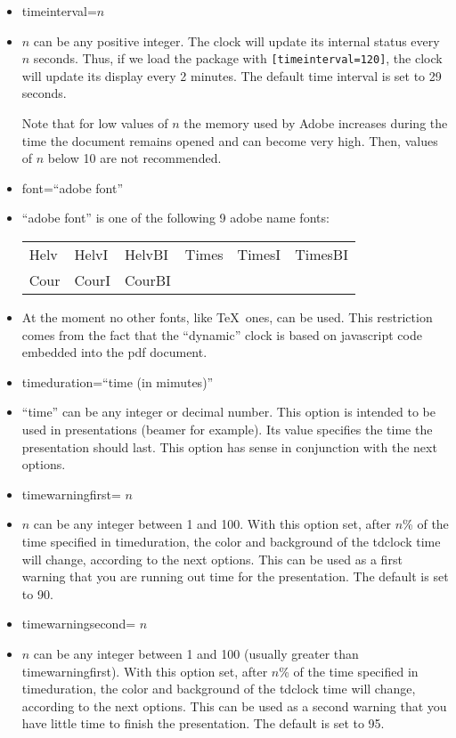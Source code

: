 \documentclass{article}
\begin{document}
\begin{itemize}
\item  timeinterval=$n$
\item[]
$n$ can be any positive integer. The clock will update its internal status every $n$ seconds.  Thus, if we load
the package with \texttt{[timeinterval=120]}, the clock will update its display every 2 minutes.
The default time interval is set to 29 seconds.

Note that for low values of $n$ the memory used by Adobe increases during the time the document remains opened and can
become very high.  Then, values of $n$ below 10 are not recommended.

\item  font=``adobe font''
\item[]
``adobe font''  is one of the following 9 adobe name fonts:\\[5pt]
\begin{tabular}{llllll}
Helv  & HelvI  & HelvBI &
Times & TimesI & TimesBI \\
Cour  & CourI  & CourBI &&&
\end{tabular}

\item[]At the moment no other fonts, like \TeX\ ones, can be used.  This restriction comes from the fact that the
``dynamic'' clock is based on javascript code embedded into the pdf document.

\item  timeduration=``time (in mimutes)''
\item[]
``time'' can be any integer or decimal number. This option is intended to be used in presentations (beamer for example).
Its value specifies the time the presentation should last.  This option has sense in conjunction with the next options.

\item  timewarningfirst= $n$
\item[]
$n$ can be any integer between 1 and 100. With this option set, after $n$\% of the time specified in  timeduration,
the color and background of the tdclock time  will change, according to the next options.
This can be used as a first warning that you are running out time for the presentation.  The default is set to 90.

\item  timewarningsecond= $n$
\item[]
$n$ can be any integer between 1 and 100 (usually greater than timewarningfirst). With this option set, after $n$\% of the time specified in  timeduration,
the color and background of the tdclock time  will change, according to the next options.
This can be used
as a second warning that you have little time to finish the presentation.  The default is set to 95.


\end{itemize}
\end{document}
